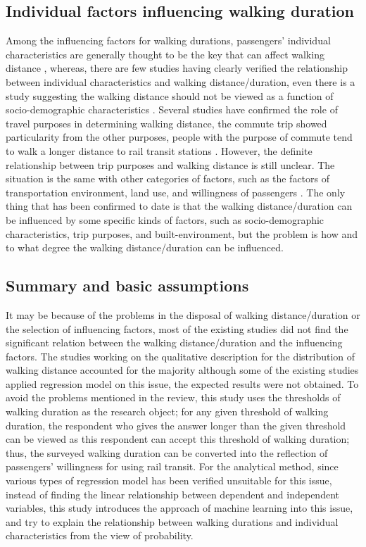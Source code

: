 \documentclass[sustainability,article,submit,moreauthors,pdftex,10pt,a4paper]{Definitions/mdpi}
\begin{document}
\subsection{Individual factors influencing walking duration}
%
Among the influencing factors for walking durations, passengers' individual characteristics are generally thought to be the key that can affect walking distance \cite{besser2005walking,weinstein2008far,krygsman2004multimodal,yang2012walking,daniels2013explaining,guerra2012half}, whereas, there are few studies having clearly verified the relationship between individual characteristics and walking distance/duration, even there is a study suggesting the walking distance should not be viewed as a function of socio-demographic characteristics \cite{krygsman2004multimodal}. Several studies have confirmed the role of travel purposes in determining walking distance, the commute trip showed particularity from the other purposes, people with the purpose of commute tend to walk a longer distance to rail transit stations \cite{larsen2010beyond}. However, the definite relationship between trip purposes and walking distance is still unclear. The situation is the same with other categories of factors, such as the factors of transportation environment, land use, and willingness of passengers \cite{guerra2012half,krygsman2004multimodal,weinstein2008far}. The only thing that has been confirmed to date is that the walking distance/duration can be influenced by some specific kinds of factors, such as socio-demographic characteristics, trip purposes, and built-environment, but the problem is how and to what degree the walking distance/duration can be influenced.

%
\subsection{Summary and basic assumptions}
%
It may be because of the problems in the disposal of walking distance/duration or the selection of influencing factors, most of the existing studies did not find the significant relation between the walking distance/duration and the influencing factors. The studies working on the qualitative description for the distribution of walking distance accounted for the majority although some of the existing studies applied regression model on this issue, the expected results were not obtained. To avoid the problems mentioned in the review, this study uses the thresholds of walking duration as the research object; for any given threshold of walking duration, the respondent who gives the answer longer than the given threshold can be viewed as this respondent can accept this threshold of walking duration; thus, the surveyed walking duration can be converted into the reflection of passengers' willingness for using rail transit. For the analytical method, since various types of regression model has been verified unsuitable for this issue, instead of finding the linear relationship between dependent and independent variables, this study introduces the approach of machine learning into this issue, and try to explain the relationship between walking durations and individual characteristics from the view of probability.
\end{document}
